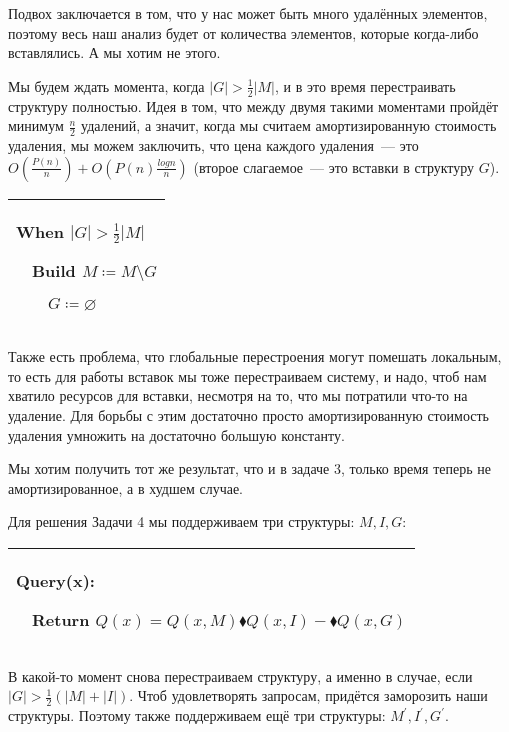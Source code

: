 Подвох заключается в том, что у нас может быть много удалённых элементов, поэтому весь наш анализ будет от количества элементов, которые когда-либо вставлялись. А мы хотим не этого.

Мы будем ждать момента, когда $|G|>\frac{1}{2}|M|$, и в это время перестраивать структуру полностью. Идея в том, что между двумя такими моментами пройдёт минимум $\frac{n}{2}$ удалений, а значит, когда мы считаем амортизированную стоимость удаления, мы можем заключить, что цена каждого удаления~--- это
$O\left(\frac{P(n)}{n}\right)+O\left(P(n)\frac{log n}{n}\right)$ (второе слагаемое~--- это вставки в структуру $G$).


\begin{tabular}{|p{5cm}|}
    \hline

    When $|G|>\frac{1}{2}|M|$

    $\quad$Build $M \coloneqq M\setminus G$

    $\quad$$\quad$$G \coloneqq \varnothing$ \\

    \hline
\end{tabular}

Также есть проблема, что глобальные перестроения могут помешать локальным, то есть для работы вставок мы тоже перестраиваем систему, и надо, чтоб нам хватило ресурсов для вставки, несмотря на то, что мы потратили что-то на удаление. Для борьбы с этим достаточно просто амортизированную стоимость удаления умножить на достаточно большую константу.



\begin{task}
    Мы хотим получить тот же результат, что и в задаче 3, только время теперь не амортизированное, а в худшем случае.
\end{task}

Для решения Задачи 4 мы поддерживаем три структуры: $M,I,G$:


\begin{tabular}{|p{8cm}|}
    \hline
    Query(x):

    $\quad$Return $Q(x)=Q(x,M)\blacklozenge Q(x,I)-\blacklozenge Q(x,G)$ \\
    \hline
\end{tabular}


В какой-то момент снова перестраиваем структуру, а именно в случае, если $|G|>\frac{1}{2}(|M|+|I|)$. Чтоб удовлетворять запросам, придётся заморозить наши структуры. Поэтому также поддерживаем ещё три структуры: $M^\prime,I^\prime,G^\prime$.

